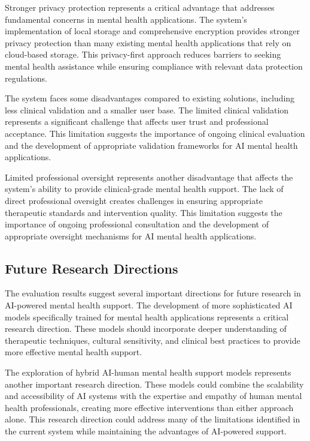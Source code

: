 Stronger privacy protection represents a critical advantage that addresses fundamental concerns in mental health applications. The system's implementation of local storage and comprehensive encryption provides stronger privacy protection than many existing mental health applications that rely on cloud-based storage. This privacy-first approach reduces barriers to seeking mental health assistance while ensuring compliance with relevant data protection regulations.

The system faces some disadvantages compared to existing solutions, including less clinical validation and a smaller user base. The limited clinical validation represents a significant challenge that affects user trust and professional acceptance. This limitation suggests the importance of ongoing clinical evaluation and the development of appropriate validation frameworks for AI mental health applications.

Limited professional oversight represents another disadvantage that affects the system's ability to provide clinical-grade mental health support. The lack of direct professional oversight creates challenges in ensuring appropriate therapeutic standards and intervention quality. This limitation suggests the importance of ongoing professional consultation and the development of appropriate oversight mechanisms for AI mental health applications.

\subsection{Future Research Directions}

The evaluation results suggest several important directions for future research in AI-powered mental health support. The development of more sophisticated AI models specifically trained for mental health applications represents a critical research direction. These models should incorporate deeper understanding of therapeutic techniques, cultural sensitivity, and clinical best practices to provide more effective mental health support.

The exploration of hybrid AI-human mental health support models represents another important research direction. These models could combine the scalability and accessibility of AI systems with the expertise and empathy of human mental health professionals, creating more effective interventions than either approach alone. This research direction could address many of the limitations identified in the current system while maintaining the advantages of AI-powered support.

